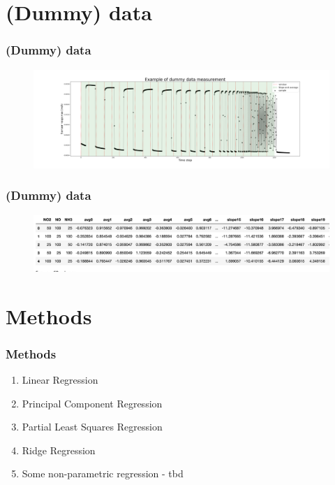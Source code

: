 \documentclass{beamer}
\begin{document}
\section{(Dummy) data}
\begin{frame}
	
	\frametitle{(Dummy) data}
	\begin{figure}[!htb]
		\centering
		\includegraphics[width=1.2\textwidth]{../../figures/dummy-data.png}
	\end{figure} 

\end{frame}

\begin{frame}
	\frametitle{(Dummy) data}
	
	\begin{figure}[!htb]
		\centering
		\includegraphics[width=1\textwidth]{../../figures/dummy-feats.png}
	\end{figure} 
	
 	\end{frame}


\section{Methods}
\begin{frame}
	
	\frametitle{Methods}
	\pause
	\begin{enumerate}
		\item Linear Regression
		\pause
		\item Principal Component Regression
		\pause
		\item Partial Least Squares Regression
		\pause
		\item Ridge Regression
		\pause
		\item Some non-parametric regression - tbd
	\end{enumerate}
	
\end{frame}
\end{document}
